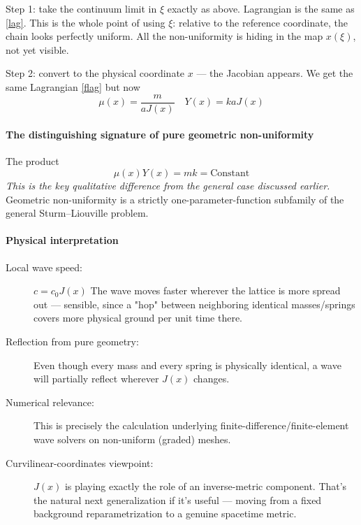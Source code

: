Step 1: take the continuum limit in $\xi$ exactly as above.
Lagrangian is the same as \eqref{lag}.
 This is the whole point of using $\xi$: relative to the reference coordinate, the chain looks perfectly uniform. All the non-uniformity is hiding in the map $x(\xi)$, not yet visible.

Step 2: convert to the physical coordinate $x$ — the Jacobian appears. 
We get the same Lagrangian \eqref{flag} but now
\begin{equation}
   \label {muY}
    \mu(x)=\frac{m}{a J(x)} \quad Y(x)=k a J(x)
\end{equation}

\paragraph{The distinguishing signature of pure geometric non-uniformity}
The product \[\mu(x) Y(x)=m k=\text{Constant}\]
\emph{This is the key qualitative difference from the general 
case discussed earlier.} Geometric non-uniformity is a strictly one-parameter-function subfamily of the general Sturm–Liouville problem.

\paragraph{Physical interpretation}
\begin{description}
    \item [Local wave speed:] $c=c_0 J(x)$ 
The wave moves faster wherever the lattice is more spread out — sensible, since a "hop" between neighboring identical masses/springs covers more physical ground per unit time there.  
    \item [Reflection from pure geometry:] Even though every mass and every spring is physically identical, a wave will partially reflect wherever $J(x)$ changes.
    \item [Numerical relevance:] This is precisely the calculation underlying finite-difference/finite-element wave solvers on non-uniform (graded) meshes.
    \item [Curvilinear-coordinates viewpoint:] $J(x)$  is playing exactly the role of an inverse-metric component. That's the natural next generalization if it's useful — moving from a fixed background reparametrization 
 to a genuine spacetime metric.
\end{description}


